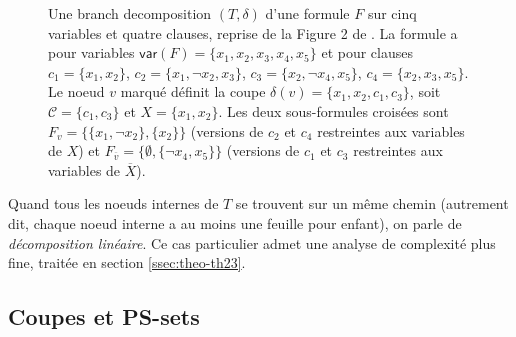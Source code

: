 \documentclass[11pt,a4paper]{report}
\theoremstyle{plain}
\theoremstyle{definition}
\begin{document}
\begin{figure}[htbp]
\centering
{}
\caption{Une branch decomposition $(T, \delta)$ d'une formule $F$
sur cinq variables et quatre clauses, reprise de la Figure 2 de
\cite{saether2015}. La formule a pour variables
$\mathsf{var}(F) = \{x_1, x_2, x_3, x_4, x_5\}$ et pour clauses
$c_1 = \{x_1, x_2\}$, $c_2 = \{x_1, \neg x_2, x_3\}$,
$c_3 = \{x_2, \neg x_4, x_5\}$, $c_4 = \{x_2, x_3, x_5\}$. Le
noeud $v$ marqué définit la coupe
$\delta(v) = \{x_1, x_2, c_1, c_3\}$, soit
$\mathcal{C} = \{c_1, c_3\}$ et $X = \{x_1, x_2\}$. Les deux
sous-formules croisées sont
$F_v = \{\{x_1, \neg x_2\}, \{x_2\}\}$ (versions de $c_2$ et $c_4$
restreintes aux variables de $X$) et
$F_{\overline{v}} = \{\emptyset, \{\neg x_4, x_5\}\}$ (versions de
$c_1$ et $c_3$ restreintes aux variables de $\overline{X}$).}
\label{fig:branch-decomp-example}
\end{figure}

Quand tous les noeuds internes de $T$ se trouvent sur un même chemin
(autrement dit, chaque noeud interne a au moins une feuille pour
enfant), on parle de \emph{décomposition linéaire}. Ce cas particulier
admet une analyse de complexité plus fine, traitée en
section \ref{ssec:theo-th23}.

\subsection{Coupes et PS-sets}
\label{ssec:theo-cuts-psset}
\end{document}
